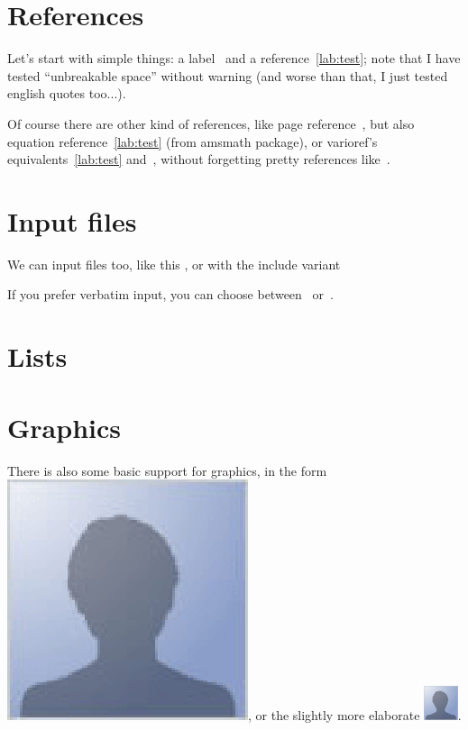 \documentclass[a4paper,12pt]{article}
\begin{document}
\tableofcontents

\section{References}

Let's start with simple things: a label~\label{lab:test} and a
reference~\ref{lab:test}; note that I have tested ``unbreakable
space'' without warning (and worse than that, I just tested english
quotes too...).

Of course there are other kind of references, like page
reference~\pageref{lab:test}, but also equation
reference~\eqref{lab:test} (from amsmath package), or varioref's
equivalents~\vref{lab:test} and~, without
forgetting pretty references like~.

\section{Input files}

We can input files too, like this , or with the include
variant 

If you prefer verbatim input, you can choose
between~ or~.

\section{Lists}

\listoffigures
\listoftables

\section{Graphics}

There is also some basic support for graphics, in the form
\includegraphics{foo.eps}, or the slightly more elaborate
\includegraphics[height=1cm, width=1cm]{foo.eps}.
\end{document}
